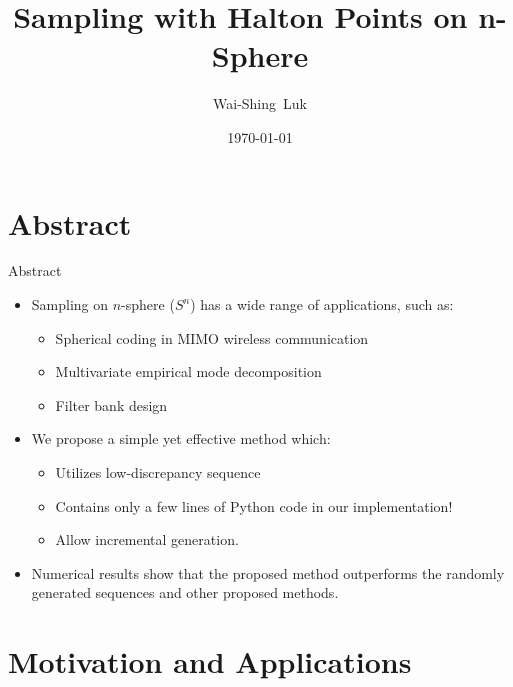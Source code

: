 \documentclass[10pt,ignorenonframetext,serif,onlymath]{beamer}
\title{Sampling with Halton Points on n-Sphere}
\author{Wai-Shing~Luk}
\institute{Fudan University}
\date{\today}
\begin{document}
\frame{\titlepage}

\begin{frame}
\tableofcontents[hideallsubsections]
\end{frame}
\hypertarget{abstract}{%
\section{Abstract}\label{abstract}}

\begin{frame}{Abstract}
\protect\hypertarget{abstract-1}{}

\begin{itemize}
\item
  Sampling on \(n\)-sphere (\(S^n\)) has a wide range of applications,
  such as:

  \begin{itemize}
  \item
    Spherical coding in MIMO wireless communication
  \item
    Multivariate empirical mode decomposition
  \item
    Filter bank design
  \end{itemize}
\item
  We propose a simple yet effective method which:

  \begin{itemize}
  \item
    Utilizes low-discrepancy sequence
  \item
    Contains only a few lines of Python code in our implementation!
  \item
    Allow incremental generation.
  \end{itemize}
\item
  Numerical results show that the proposed method outperforms the
  randomly generated sequences and other proposed methods.
\end{itemize}

\end{frame}

\hypertarget{motivation-and-applications}{%
\section{Motivation and
Applications}\label{motivation-and-applications}}
\end{document}
